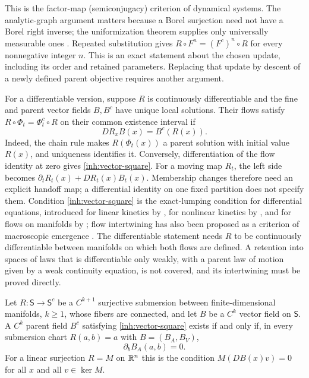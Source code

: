 This is the factor-map (semiconjugacy) criterion of dynamical systems. The
analytic-graph argument matters because a Borel surjection need not have a
Borel right inverse; the uniformization theorem supplies only universally
measurable ones \citep[Sec.~18.A]{Kechris1995}. Repeated substitution gives
$R\circ F^n=(F^c)^n\circ R$ for every nonnegative integer $n$. This is an
exact statement about the chosen update, including its order and retained
parameters. Replacing that update by descent of a newly defined parent
objective requires another argument.

For a differentiable version, suppose $R$ is continuously differentiable and
the fine and parent vector fields $B,B^c$ have unique local solutions. Their
flows satisfy $R\circ\Phi_t=\Phi_t^c\circ R$ on their common existence
interval if
\begin{equation}
 DR_x B(x)=B^c(R(x)).
 \label{inh:vector-square}
\end{equation}
Indeed, the chain rule makes $R(\Phi_t(x))$ a parent solution with initial
value $R(x)$, and uniqueness identifies it. Conversely, differentiation of
the flow identity at zero gives \cref{inh:vector-square}. For a moving map
$R_t$, the left side becomes $\partial_tR_t(x)+DR_t(x)B_t(x)$.
Membership changes therefore need an explicit handoff map; a differential
identity on one fixed partition does not specify them. Condition
\cref{inh:vector-square} is the exact-lumping condition for differential
equations, introduced for linear kinetics by \citet{WeiKuo1969}, for
nonlinear kinetics by \citet{LiRabitz1989}, and for flows on manifolds by
\citet{HorstmeyerAtay2016}; flow intertwining has also been proposed as a
criterion of macroscopic emergence \citep{BarnettSeth2023}. The
differentiable statement needs $R$ to be continuously differentiable between
manifolds on which both flows are defined. A retention into spaces of laws
that is differentiable only weakly, with a parent law of motion given by a
weak continuity equation, is not covered, and its intertwining must be
proved directly.

Let $R:\mathsf S\to\mathsf S^c$ be a $C^{k+1}$ surjective submersion between
finite-dimensional manifolds, $k\geq1$, whose fibers are connected, and let
$B$ be a $C^k$ vector field on $\mathsf S$. A $C^k$ parent field $B^c$
satisfying \cref{inh:vector-square} exists if and only if, in every
submersion chart $R(a,b)=a$ with $B=(B_A,B_V)$,
\begin{equation}
 \partial_bB_A(a,b)=0.
 \label{inh:projectable-criterion}
\end{equation}
For a linear surjection $R=M$ on $\mathbb R^n$ this is the condition
$M(DB(x)v)=0$ for all $x$ and all $v\in\ker M$.

